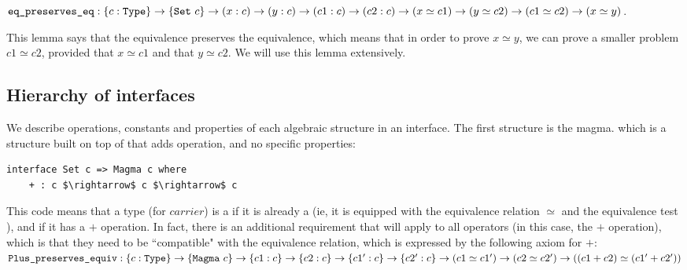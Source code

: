 ${\mbox{\texttt{eq\_preserves\_eq}}} : \{c:{\mbox{\texttt{Type}}}\} \rightarrow \{{\mbox{\texttt{Set}}}\ c\} \rightarrow (x:c) \rightarrow (y:c) \rightarrow (c1:c) \rightarrow (c2:c) \rightarrow (x \simeq c1) \rightarrow (y \simeq c2) \rightarrow (c1 \simeq c2) \rightarrow (x \simeq y)$.





This lemma says that the equivalence preserves the equivalence, which means
that in order to prove $x \simeq y$, we can prove a smaller
problem $c1 \simeq c2$, provided that $x \simeq c1$ and that $y \simeq c2$.
We will use this lemma extensively.

\subsection{Hierarchy of interfaces}

We describe operations, constants and properties of each algebraic structure
in an interface. The first structure is
the magma. which is a structure built on top of  that adds
 operation, and no specific properties:

\begin{lstlisting}
interface Set c => Magma c where
    + : c $\rightarrow$ c $\rightarrow$ c
\end{lstlisting}

This code means that a type  (for $carrier$) is a  if it is
already a  (ie, it is equipped with the equivalence relation $\simeq$
and the equivalence test ), and if it has a $+$ operation.  In
fact, there is an additional requirement that will apply to all operators (in
this case, the $+$ operation), which is that they need to be ``compatible" with
the equivalence relation, which is expressed by the following axiom for $+$:
\\ ${\mbox{\texttt{Plus\_preserves\_equiv}}} : \{c:{\mbox{\texttt{Type}}}\} \rightarrow
\{{\mbox{\texttt{Magma}}}\ c\} \rightarrow\{c1:c\} \rightarrow \{c2:c\} \rightarrow
\{c1':c\} \rightarrow \{c2':c\} \rightarrow (c1 \simeq c1') \rightarrow (c2
\simeq c2') \rightarrow ((c1+c2) \simeq (c1'+c2'))$ 


